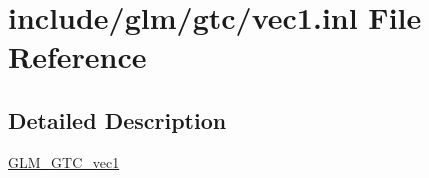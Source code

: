 \hypertarget{vec1_8inl}{}\section{include/glm/gtc/vec1.inl File Reference}
\label{vec1_8inl}


\subsection{Detailed Description}
\hyperlink{group__gtc__vec1}{G\+L\+M\+\_\+\+G\+T\+C\+\_\+vec1} 